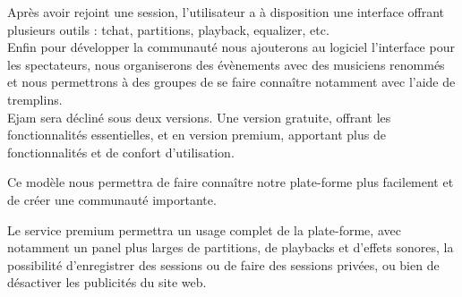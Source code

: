 \documentclass[a4,12pt]{article}
\begin{document}
Après avoir rejoint une session, l'utilisateur a à disposition une interface offrant plusieurs outils : tchat, partitions, playback, equalizer, etc.\\


Enfin pour développer la communauté nous ajouterons au logiciel
l’interface pour les spectateurs, nous organiserons des évènements avec des
musiciens renommés et nous permettrons à des groupes de se faire connaître notamment
avec l’aide de tremplins.
\\

Ejam sera décliné sous deux versions. Une version gratuite, offrant les fonctionnalités essentielles, et en version premium, apportant plus de fonctionnalités et de confort d'utilisation.

Ce modèle nous permettra de faire connaître notre plate-forme plus facilement et de créer une communauté importante.

Le service premium permettra un usage complet de la plate-forme, avec notamment un panel plus larges de partitions, de playbacks et d'effets sonores, la possibilité d'enregistrer des sessions ou de faire des sessions privées, ou bien de désactiver les publicités du site web.
\end{document}
